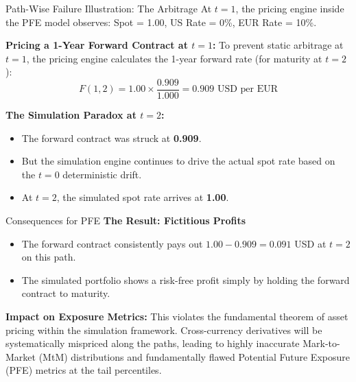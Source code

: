 \documentclass{beamer}
\begin{document}
	\begin{frame}{Path-Wise Failure Illustration: The Arbitrage}
		At $t=1$, the pricing engine inside the PFE model observes: Spot = 1.00, US Rate = 0\%, EUR Rate = 10\%.
		
		\vspace{0.5cm}
		\textbf{Pricing a 1-Year Forward Contract at $t=1$:}
		To prevent static arbitrage at $t=1$, the pricing engine calculates the 1-year forward rate (for maturity at $t=2$):
		$$F(1, 2) = 1.00 \times \frac{0.909}{1.000} = 0.909 \text{ USD per EUR}$$
		
		\vspace{0.5cm}
		\textbf{The Simulation Paradox at $t=2$:}
		\begin{itemize}
			\item The forward contract was struck at \textbf{0.909}.
			\item But the simulation engine continues to drive the actual spot rate based on the $t=0$ deterministic drift.
			\item At $t=2$, the simulated spot rate arrives at \textbf{1.00}.
		\end{itemize}
	\end{frame}
	
	\begin{frame}{Consequences for PFE}
		\textbf{The Result: Fictitious Profits}
		\begin{itemize}
			\item The forward contract consistently pays out $1.00 - 0.909 = 0.091$ USD at $t=2$ on this path.
			\item The simulated portfolio shows a risk-free profit simply by holding the forward contract to maturity.
		\end{itemize}
		
		\vspace{0.5cm}
		\textbf{Impact on Exposure Metrics:}
		This violates the fundamental theorem of asset pricing within the simulation framework. Cross-currency derivatives will be systematically mispriced along the paths, leading to highly inaccurate Mark-to-Market (MtM) distributions and fundamentally flawed Potential Future Exposure (PFE) metrics at the tail percentiles.
	\end{frame}
	
	
	
	
	
\end{document}
